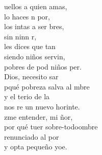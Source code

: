 \documentclass[12pt]{article}
\begin{document}
\begin{multicols*}{2}
\begin{cancion}
\jump
	uellos a quien amas,\\
	lo haces n por,\\
	los intas a ser bres, \\
	sin ninn r,\\
	les dices que tan \\
	siendo niños servin, \\
	pobres de pod niños  per.\\
\jump
	 Dios, necesito sar\\
	pqué  pobreza salva al mbre\\
	y el terio de la \\
	nos re un nuevo horinte.   \\
\jump
	zme entender, mi ñor,\\
	por qué tuer sobre-todoombre\\
	 renunciado al por\\
	y opta  pequeño yoe.\\
\end{cancion}%


\end{multicols*}
\end{document}
